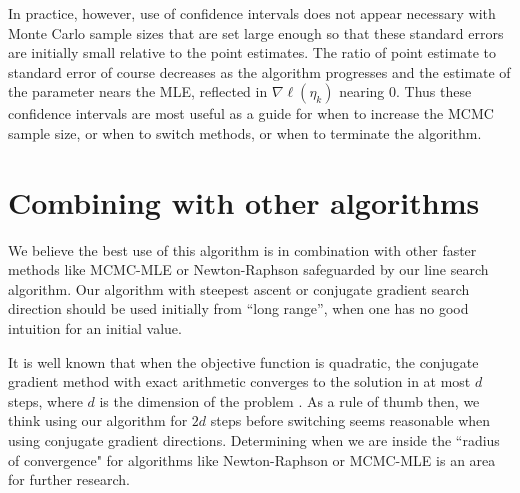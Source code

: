 In practice, however, use of confidence intervals does not appear necessary with  
Monte Carlo sample sizes that are set 
large enough so that these standard errors are initially small relative to the point 
estimates.  The ratio of point 
estimate to standard error of course decreases as the algorithm progresses and the 
estimate of the parameter nears the 
MLE, reflected in $\nabla \ell( \eta_k )$ nearing 0.  Thus these confidence intervals 
are most useful as a guide for
when to increase the MCMC sample size, or when to switch methods, or when to terminate 
the algorithm.


\section{Combining with other algorithms} \label{S:Combine}
We believe the best use of this algorithm is in combination with other faster methods 
like MCMC-MLE \citep{Geyer:1992}
or Newton-Raphson safeguarded by our line search algorithm.  Our algorithm with 
steepest ascent or conjugate gradient search direction
should be used initially from ``long range'', when one has no good intuition for an 
initial value.

It is well known that when the objective function is quadratic, the conjugate gradient 
method with exact arithmetic converges to the solution
in at most $d$ steps, where $d$ is the dimension of the problem \citep[Chapter 5]{NW}.  As a rule 
of thumb then, we think using our 
algorithm for $2d$ steps before switching seems reasonable when using conjugate
gradient directions.  Determining when we are inside the ``radius of convergence"
for algorithms like Newton-Raphson or MCMC-MLE is an area for further research.

